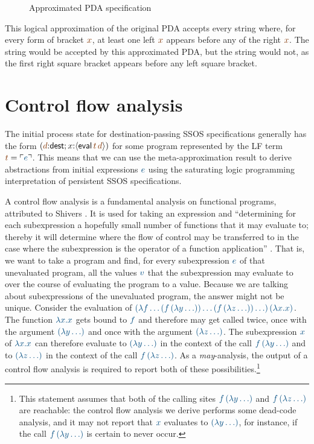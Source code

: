 \begin{figure}[ht]
\caption{Approximated PDA specification}
\label{fig:pda-pers-approx2}
\end{figure}

This logical approximation of the
original PDA accepts every string where, for every form of bracket
$\lf{x}$, at least one left $\lf{x}$ appears before any of the right 
$\lf{x}$. The
string \obj{\mbox{\sf [ ] ] ] ( ( )}} 
would be accepted by this approximated PDA,
but the string \obj{\mbox{\sf ( ) ] [ [ ]}} 
would not, as the first right square
bracket appears before any left square bracket.


\section{Control flow analysis}
\label{sec:0cfa}

The initial process state for destination-passing SSOS specifications
generally has the form 
$(\lf{d}{:}{\sf dest}; x{:}\susp{{\sf eval}\,\lf{t}\,\lf{d}})$
for some program represented by the LF term $\lf{t} = \interp{e}$. 
This means that we
can use the meta-approximation result to derive abstractions from
initial expressions $\obj{e}$ using the saturating logic programming
interpretation of persistent SSOS specifications.

A control flow analysis is a fundamental analysis on functional
programs, attributed to Shivers \cite{shivers88control}. It is used
for taking an expression and ``determining for each subexpression a
hopefully small number of functions that it may evaluate to; thereby
it will determine where the flow of control may be transferred to in
the case where the subexpression is the operator of a function
application'' \cite[p. 142]{nielson05principles}. That is, we want to
take a program and find, for every subexpression $\obj{e}$ of that
unevaluated program, all the values $\obj{v}$ that the subexpression
may evaluate to over the course of evaluating the program to a
value. Because we are talking about subexpressions of the unevaluated
program, the answer might not be unique. Consider the evaluation of
$\obj{(\lambda f\ldots (f\,(\lambda y\ldots)) \ldots (f\,(\lambda
  z\ldots)) \ldots )\,(\lambda x.x)}$. The function $\obj{\lambda
  x.x}$ gets bound to $\obj{f}$ and therefore may get called twice,
once with the argument $\obj{(\lambda y\ldots)}$ and once with the
argument $\obj{(\lambda z\ldots)}$. The subexpression $\obj{x}$ of
$\obj{\lambda x.x}$ can therefore evaluate to $\obj{(\lambda
  y\ldots)}$ in the context of the call $\obj{f\,(\lambda y\ldots)}$
and to $\obj{(\lambda z\ldots)}$ in the context of the call
$\obj{f\,(\lambda z\ldots)}$. As a {\it may}-analysis, the output of a
control flow analysis is required to report both of these
possibilities.\footnote{This statement assumes that both of the
  calling sites $\obj{f\,(\lambda y\ldots)}$ and $\obj{f\,(\lambda
    z\ldots)}$ are reachable: the control flow analysis we derive
  performs some dead-code analysis, and it may not report that
  $\obj{x}$ evaluates to $\obj{(\lambda y\ldots)}$, for instance, if
  the call $\obj{f\,(\lambda y\ldots)}$ is certain to never occur.}

